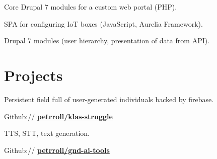\documentclass[a4paper]{deedy-resume} %
\begin{document}
\begin{minipage}[t]{0.62\textwidth}
\sectionspace %



\begin{tightitemize}
\item Core Drupal 7 modules for a custom web portal (PHP).
\item SPA for configuring IoT boxes (JavaScript, Aurelia Framework).
\end{tightitemize}

\begin{tightitemize}
\item Drupal 7 modules (user hierarchy, presentation of data from API).
\end{tightitemize}

\sectionspace %

\section{Projects}


\emptyLocation %
\begin{tightitemize}
\item Persistent field full of user-generated individuals backed by firebase.
\item Github:// \href{https://github.com/petrroll/klas-struggle}{\bf petrroll/klas-struggle}
\end{tightitemize}

\sectionspace %


\emptyLocation %
\begin{tightitemize}
\item TTS, STT, text generation.
\item Github:// \href{https://github.com/petrroll/gnd-ai-tools}{\bf petrroll/gnd-ai-tools}
\end{tightitemize}


\end{minipage}
\end{document}
